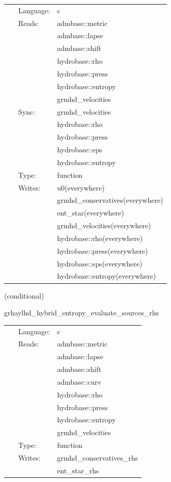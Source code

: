  \begin{tabular*}{160mm}{cll} 
~ & Language:  & c \\ 
~ & Reads:  & admbase::metric \\ 
~& ~ &admbase::lapse\\ 
~& ~ &admbase::shift\\ 
~& ~ &hydrobase::rho\\ 
~& ~ &hydrobase::press\\ 
~& ~ &hydrobase::entropy\\ 
~& ~ &grmhd\_velocities\\ 
~ & Sync:  & grmhd\_velocities \\ 
~& ~ &hydrobase::rho\\ 
~& ~ &hydrobase::press\\ 
~& ~ &hydrobase::eps\\ 
~& ~ &hydrobase::entropy\\ 
~ & Type:  & function \\ 
~ & Writes:  & u0(everywhere) \\ 
~& ~ &grmhd\_conservatives(everywhere)\\ 
~& ~ &ent\_star(everywhere)\\ 
~& ~ &grmhd\_velocities(everywhere)\\ 
~& ~ &hydrobase::rho(everywhere)\\ 
~& ~ &hydrobase::press(everywhere)\\ 
~& ~ &hydrobase::eps(everywhere)\\ 
~& ~ &hydrobase::entropy(everywhere)\\ 
\end{tabular*} 


\vspace{5mm}

   (conditional) 

\hspace{5mm} grhaylhd\_hybrid\_entropy\_evaluate\_sources\_rhs 

\hspace{5mm}{\it entropy+hybrid version of grhaylhd\_evaluate\_sources\_rhs } 


\hspace{5mm}

 \begin{tabular*}{160mm}{cll} 
~ & Language:  & c \\ 
~ & Reads:  & admbase::metric \\ 
~& ~ &admbase::lapse\\ 
~& ~ &admbase::shift\\ 
~& ~ &admbase::curv\\ 
~& ~ &hydrobase::rho\\ 
~& ~ &hydrobase::press\\ 
~& ~ &hydrobase::entropy\\ 
~& ~ &grmhd\_velocities\\ 
~ & Type:  & function \\ 
~ & Writes:  & grmhd\_conservatives\_rhs \\ 
~& ~ &ent\_star\_rhs\\ 
\end{tabular*} 


